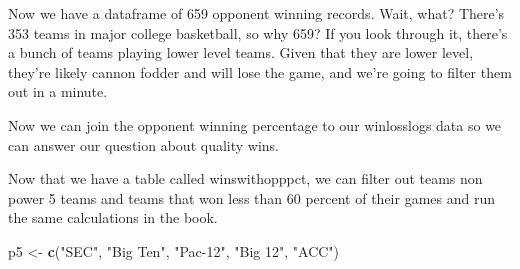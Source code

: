\documentclass[
]{book}
\newenvironment{Shaded}{\begin{snugshade}}{\end{snugshade}}
\newcommand{\DataTypeTok}[1]{\textcolor[rgb]{0.13,0.29,0.53}{#1}}
\newcommand{\DecValTok}[1]{\textcolor[rgb]{0.00,0.00,0.81}{#1}}
\newcommand{\KeywordTok}[1]{\textcolor[rgb]{0.13,0.29,0.53}{\textbf{#1}}}
\newcommand{\NormalTok}[1]{#1}
\newcommand{\OperatorTok}[1]{\textcolor[rgb]{0.81,0.36,0.00}{\textbf{#1}}}
\newcommand{\StringTok}[1]{\textcolor[rgb]{0.31,0.60,0.02}{#1}}
\begin{document}
Now we have a dataframe of 659 opponent winning records. Wait, what? There's 353 teams in major college basketball, so why 659? If you look through it, there's a bunch of teams playing lower level teams. Given that they are lower level, they're likely cannon fodder and will lose the game, and we're going to filter them out in a minute.

Now we can join the opponent winning percentage to our winlosslogs data so we can answer our question about quality wins.

\begin{Shaded}
\end{Shaded}

\begin{Shaded}
\end{Shaded}

Now that we have a table called winswithopppct, we can filter out teams non power 5 teams and teams that won less than 60 percent of their games and run the same calculations in the book.

\begin{Shaded}
\begin{Highlighting}[]
\NormalTok{p5 <-}\StringTok{ }\KeywordTok{c}\NormalTok{(}\StringTok{"SEC"}\NormalTok{, }\StringTok{"Big Ten"}\NormalTok{, }\StringTok{"Pac-12"}\NormalTok{, }\StringTok{"Big 12"}\NormalTok{, }\StringTok{"ACC"}\NormalTok{)}
\end{Highlighting}
\end{Shaded}
\end{document}
